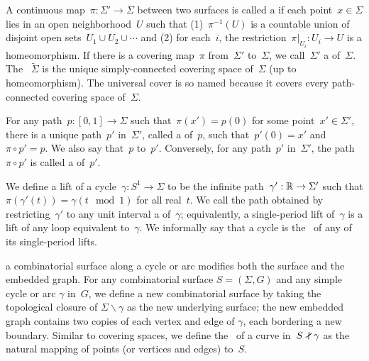 A continuous map~$\pi : \Sigma' \to \Sigma$ between two surfaces is called a
 if each point~$x \in \Sigma$ lies in an open
neighborhood~$U$ such that (1)~$\pi^{-1}(U)$ is a countable union of disjoint
open sets~$U_1 \cup U_2 \cup \cdots$ and (2) for each~$i$, the
restriction~$\pi |_{U_i} : U_i \to U$ is a homeomorphism. If there is a covering
map~$\pi$ from~$\Sigma'$ to~$\Sigma$, we call~$\Sigma'$ a 
of~$\Sigma$. The ~$\tilde{\Sigma}$ is the unique
simply-connected covering space of~$\Sigma$ (up to homeomorphism).
The universal cover is so named because it covers every path-connected
covering space of~$\Sigma$.

For any path~$p : [0,1] \to \Sigma$ such that~$\pi(x') = p(0)$ for some
point~$x' \in \Sigma'$, there is a unique path~$p'$ in~$\Sigma'$, called
a  of~$p$, such that~$p'(0) = x'$ and~$\pi \circ p' = p$. We also
say that~$p$  to~$p'$. Conversely, for any path~$p'$ in~$\Sigma'$,
the path~$\pi \circ p'$ is called a  of~$p'$.

We define a lift of a cycle~$\gamma : S^1 \to \Sigma$ to be the infinite
path~$\gamma' : \R \to \Sigma'$ such that
${\pi(\gamma'(t)) = \gamma(t \mod 1)}$
for all real~$t$. We call the path obtained by restricting~$\gamma'$ to any
unit interval a  of~$\gamma$; equivalently, a
single-period lift of~$\gamma$ is a lift of any loop equivalent to~$\gamma$.
We informally say that a cycle is the~ of any of its
single-period lifts.

 a combinatorial surface along a cycle or  arc modifies both the surface and the embedded graph.
For any combinatorial surface $S = (\Sigma, G)$ and any simple cycle or arc $\gamma$ in~$G$, we define a new combinatorial surface  by taking the topological closure of $\Sigma \backslash \gamma$ as the new underlying surface; the new embedded graph contains two copies of each vertex and edge of $\gamma$, each bordering a new boundary.
Similar to covering spaces, we define the~ of a curve in~$S \snip \gamma$ as the natural mapping of points (or vertices and edges) to~$S$.
